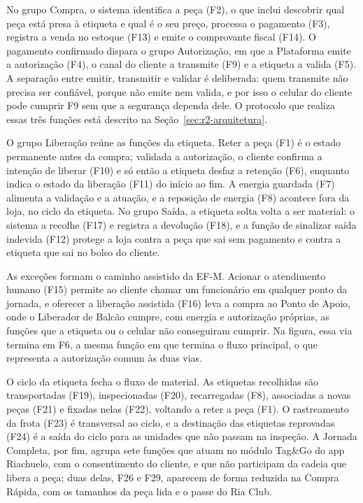 No grupo Compra, o sistema identifica a peça (F2), o que inclui descobrir qual peça está presa à etiqueta e qual é o seu preço, processa o pagamento (F3), registra a venda no estoque (F13) e emite o comprovante fiscal (F14). O pagamento confirmado dispara o grupo Autorização, em que a Plataforma emite a autorização (F4), o canal do cliente a transmite (F9) e a etiqueta a valida (F5). A separação entre emitir, transmitir e validar é deliberada: quem transmite não precisa ser confiável, porque não emite nem valida, e por isso o celular do cliente pode cumprir F9 sem que a segurança dependa dele. O protocolo que realiza essas três funções está descrito na Seção~\ref{sec:r2-arquitetura}.

O grupo Liberação reúne as funções da etiqueta. Reter a peça (F1) é o estado permanente antes da compra; validada a autorização, o cliente confirma a intenção de liberar (F10) e só então a etiqueta desfaz a retenção (F6), enquanto indica o estado da liberação (F11) do início ao fim. A energia guardada (F7) alimenta a validação e a atuação, e a reposição de energia (F8) acontece fora da loja, no ciclo da etiqueta. No grupo Saída, a etiqueta solta volta a ser material: o sistema a recolhe (F17) e registra a devolução (F18), e a função de sinalizar saída indevida (F12) protege a loja contra a peça que sai sem pagamento e contra a etiqueta que sai no bolso do cliente.

As exceções formam o caminho assistido da EF-M. Acionar o atendimento humano (F15) permite ao cliente chamar um funcionário em qualquer ponto da jornada, e oferecer a liberação assistida (F16) leva a compra ao Ponto de Apoio, onde o Liberador de Balcão cumpre, com energia e autorização próprias, as funções que a etiqueta ou o celular não conseguiram cumprir. Na figura, essa via termina em F6, a mesma função em que termina o fluxo principal, o que representa a autorização comum às duas vias.

O ciclo da etiqueta fecha o fluxo de material. As etiquetas recolhidas são transportadas (F19), inspecionadas (F20), recarregadas (F8), associadas a novas peças (F21) e fixadas nelas (F22), voltando a reter a peça (F1). O rastreamento da frota (F23) é transversal ao ciclo, e a destinação das etiquetas reprovadas (F24) é a saída do ciclo para as unidades que não passam na inspeção. A Jornada Completa, por fim, agrupa sete funções que atuam no módulo Tag\&Go do app Riachuelo, com o consentimento do cliente, e que não participam da cadeia que libera a peça; duas delas, F26 e F29, aparecem de forma reduzida na Compra Rápida, com os tamanhos da peça lida e o passe do Ria Club.

